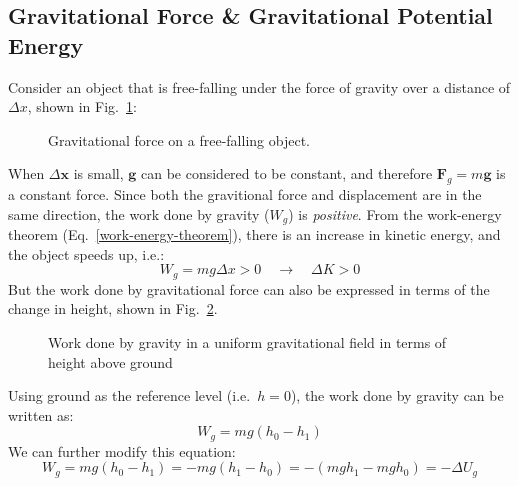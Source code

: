 \documentclass[11pt]{article}
\begin{document}
\subsection{Gravitational Force \& Gravitational Potential Energy}
Consider an object that is free-falling under the force of gravity over a
distance of $\Delta x$, shown in Fig.~\ref{falling1}:
\begin{figure}[ht]
  \centering
  \caption{Gravitational force on a free-falling object.}
  \label{falling1}
\end{figure}
When $\Delta\mathbf x$ is small, $\mathbf g$ can be considered to be constant,
and therefore $\mathbf F_g=m\mathbf g$ is a constant force. Since both the
gravitional force and displacement are in the same direction, the work done by
gravity ($W_g$) is \emph{positive}. From the work-energy theorem
(Eq.~\ref{work-energy-theorem}), there is an increase in kinetic energy, and
the object speeds up, i.e.:
\begin{equation*}
  W_g=mg\Delta x>0 \quad\longrightarrow\quad \Delta K > 0
\end{equation*}
But the work done by gravitational force can also be expressed in terms of the
change in height, shown in Fig.~\ref{falling2}.
\begin{figure}[ht]
  \centering
  \caption{Work done by gravity in a uniform gravitational field in terms of
  height above ground}
  \label{falling2}
\end{figure}
Using ground as the reference level (i.e.\ $h=0$), the work done by gravity can
be written as:
\begin{equation*}
  W_g = mg(h_0-h_1)
\end{equation*}
We can further modify this equation:
\begin{equation*}
  W_g= mg(h_0-h_1)=-mg(h_1-h_0)=-(mgh_1-mgh_0) = -\Delta U_g
\end{equation*}
\end{document}
